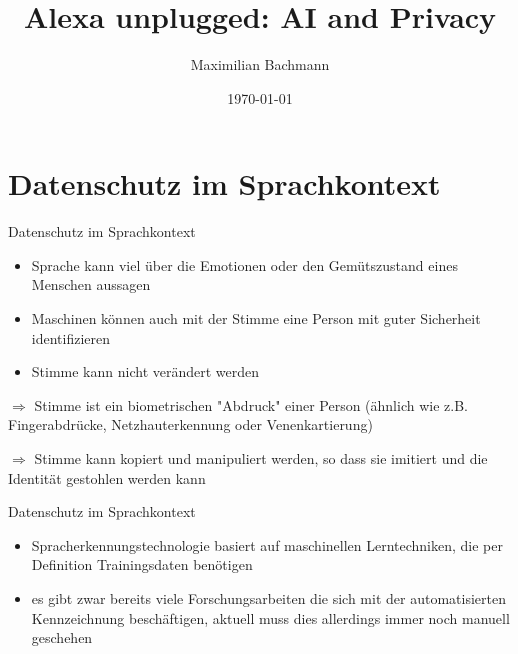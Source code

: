 \documentclass[aspectratio=169]{beamer}
\title[Alexa unplugged: AI and Privacy]{Alexa unplugged: AI and Privacy}
\author{Maximilian Bachmann\\}
\date{\today}
\begin{document}
\begin{frame}
  \titlepage
\end{frame}





\section{Datenschutz im Sprachkontext}
\begin{frame}{Datenschutz im Sprachkontext}
\begin{itemize} 
	\item Sprache kann viel über die Emotionen oder den Gemütszustand eines Menschen aussagen
	\item Maschinen können auch mit der Stimme eine Person mit guter Sicherheit identifizieren
	\item Stimme kann nicht verändert werden
\end{itemize}
$\Rightarrow$ Stimme ist ein biometrischen "Abdruck" einer Person (ähnlich wie z.B. Fingerabdrücke, Netzhauterkennung oder Venenkartierung)

$\Rightarrow$ Stimme kann kopiert und manipuliert werden, so dass sie imitiert und die Identität gestohlen werden kann

\end{frame}

\begin{frame}{Datenschutz im Sprachkontext}
	\begin{itemize} 
		\item Spracherkennungstechnologie basiert auf maschinellen Lerntechniken, die per Definition Trainingsdaten benötigen
		\item es gibt zwar bereits viele Forschungsarbeiten die sich mit der automatisierten Kennzeichnung beschäftigen, aktuell muss dies allerdings immer noch manuell geschehen
	\end{itemize}
\end{frame}
\end{document}
